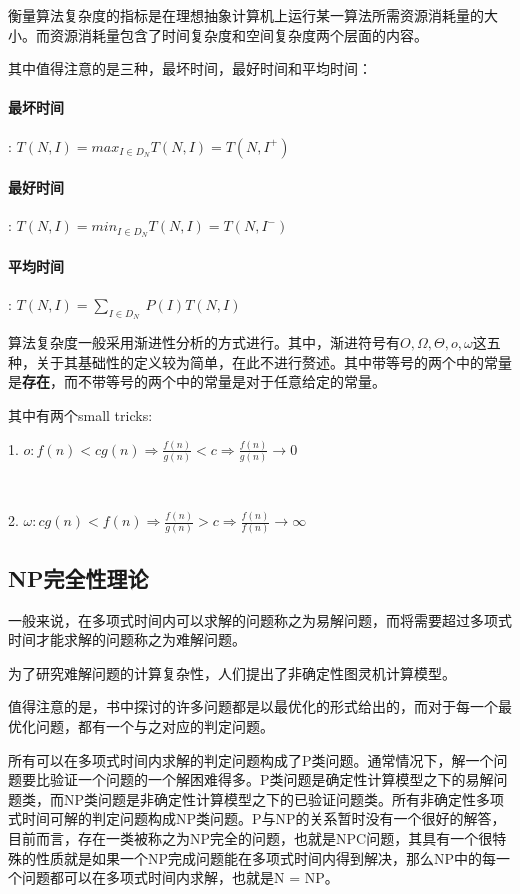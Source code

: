 \documentclass[UTF8]{ctexart}
\begin{document}
    衡量算法复杂度的指标是在理想抽象计算机上运行某一算法所需资源消耗量的大小。而资源消耗量包含了时间复杂度和空间复杂度两个层面的内容。

    其中值得注意的是三种，最坏时间，最好时间和平均时间：

    \paragraph{最坏时间}: $ T(N,I) = max _{I \in D_N } T(N, I) = T(N, I^+)$

    \paragraph{最好时间}: $ T(N,I) = min _{I \in D_N } T(N, I) = T(N, I^-)$

    \paragraph{平均时间}: $T(N,I) = \sum_{I\in D_N }  \ P(I) T(N, I)$

    算法复杂度一般采用渐进性分析的方式进行。其中，渐进符号有$O, \Omega, \Theta, o, \omega$这五种，关于其基础性的定义较为简单，在此不进行赘述。其中带等号的两个中的常量是\textbf{存在}，而不带等号的两个中的常量是对于任意给定的常量。

    其中有两个small tricks:

    1. $o: f(n) < c g(n)  \Rightarrow \frac{f(n)}{g(n)} < c \Rightarrow \frac{f(n)}{g(n)} \to 0 $

    ~

    2. $\omega: c g(n) < f(n)  \Rightarrow \frac{f(n)}{g(n)} > c \Rightarrow \frac{f(n)}{f(n)} \to \infty$

    \subsection{NP完全性理论}

    一般来说，在多项式时间内可以求解的问题称之为易解问题，而将需要超过多项式时间才能求解的问题称之为难解问题。

    为了研究难解问题的计算复杂性，人们提出了非确定性图灵机计算模型。

    值得注意的是，书中探讨的许多问题都是以最优化的形式给出的，而对于每一个最优化问题，都有一个与之对应的判定问题。

    所有可以在多项式时间内求解的判定问题构成了P类问题。通常情况下，解一个问题要比验证一个问题的一个解困难得多。P类问题是确定性计算模型之下的易解问题类，而NP类问题是非确定性计算模型之下的已验证问题类。所有非确定性多项式时间可解的判定问题构成NP类问题。P与NP的关系暂时没有一个很好的解答，目前而言，存在一类被称之为NP完全的问题，也就是NPC问题，其具有一个很特殊的性质就是如果一个NP完成问题能在多项式时间内得到解决，那么NP中的每一个问题都可以在多项式时间内求解，也就是N = NP。
\end{document}
